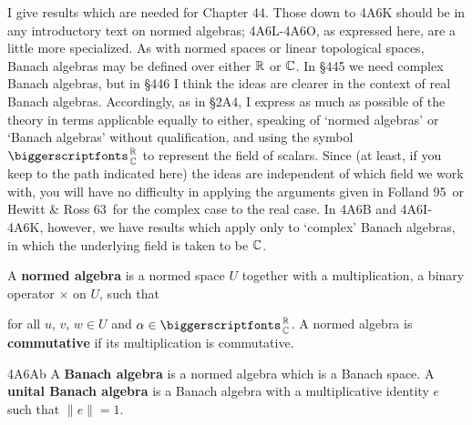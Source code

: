 
\def\chaptername{Appendix}
\def\sectionname{Banach algebras}
\def\Folland{{\smc Folland 95}}
\def\HR{{\smc Hewitt \& Ross 63}}
\def\Rudin{{\smc Rudin 91}}


I give results which are needed for Chapter 44.   Those down to 4A6K
should be in any introductory text on normed algebras;  
4A6L-4A6O, %
as expressed here, are a little more specialized.
As with normed spaces or linear topological spaces, Banach
algebras may be defined over either $\Bbb R$ or $\Bbb C$.   In \S445 we
need complex Banach algebras, but in \S446 I think the ideas are clearer
in the context of real Banach algebras.   Accordingly, as in \S2A4, I
express as much as possible of the theory in terms applicable equally to
either, speaking of `normed algebras' or `Banach algebras' without
qualification, and using the symbol $\RoverC$ to represent the field of
scalars.   Since (at least, if you keep to the path indicated here) the
ideas are independent of which field we work with, you will have no
difficulty in applying the arguments given in \Folland\ or \HR\ for the
complex case to the real case.   In 4A6B and 4A6I-4A6K, %
however, we have results which apply only to `complex' Banach algebras,
in which the underlying field is taken to be $\Bbb C$.

   A {\bf normed algebra} is a normed
space $U$ together with a multiplication, a binary operator $\times$ on
$U$, such that





\noindent for all $u$, $v$, $w\in U$ and $\alpha\in\RoverC$.
A normed algebra is {\bf commutative} if its
multiplication is commutative.

\spheader 4A6Ab A {\bf Banach algebra} is a normed algebra which is a
Banach space.   A {\bf unital Banach algebra} is a Banach
algebra with a multiplicative identity $e$ such that $\|e\|=1$.

